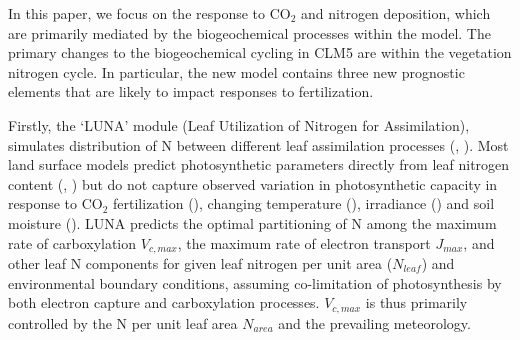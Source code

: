 \documentclass[draft,linenumbers]{agujournal}
\begin{document}
In this paper, we focus on the response to CO$_{2}$ and nitrogen deposition, which are primarily mediated by the biogeochemical processes within the model. The primary changes to the biogeochemical cycling in CLM5 are within the vegetation nitrogen cycle. In particular, the new model contains three new prognostic elements that are likely to impact responses to fertilization.

Firstly, the  `LUNA' module (Leaf Utilization of Nitrogen for Assimilation),  simulates distribution of N between different leaf assimilation processes (\cite{xu2012}, \cite{ali2016}). Most land surface models predict photosynthetic parameters directly from leaf nitrogen content (\cite{kattge2009}, \cite{bonan2012}) but do not capture observed variation in photosynthetic capacity in response to CO$_{2}$ fertilization (\cite{ainsworth2007}), changing temperature (\cite{hikosaka2005}), irradiance (\cite{niinemets1998}) and soil moisture (\cite{keenan2009}).  LUNA predicts the optimal partitioning of N among the maximum rate of carboxylation $V_{c,max}$, the maximum rate of electron transport $J_{max}$, and other leaf N components for given leaf nitrogen per unit area ($N_{leaf}$) and environmental boundary conditions, assuming co-limitation of photosynthesis by both electron capture and carboxylation processes.  $V_{c,max}$ is thus primarily controlled by the N per unit leaf area $N_{area}$ and the prevailing meteorology. 
\end{document}
